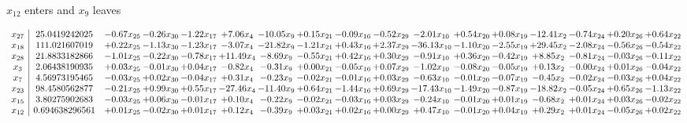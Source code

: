 \documentclass[9pt]{article}
\begin{document}
 $ x_{12} $ enters and $ x_{9} $ leaves 

 \[\begin{array}{c| c c@{\hskip 2pt} c@{\hskip 2pt} c@{\hskip 2pt} c@{\hskip 2pt} c@{\hskip 2pt} c@{\hskip 2pt} c@{\hskip 2pt} c@{\hskip 2pt} c@{\hskip 2pt} c@{\hskip 2pt} c@{\hskip 2pt} c@{\hskip 2pt} c@{\hskip 2pt} c@{\hskip 2pt} c@{\hskip 2pt} }
 x_{27}   &  25.0419242025 & -0.67 x_{25} & -0.26 x_{30} & -1.22 x_{17} & +  7.06 x_{4} & -10.05 x_{9} & +  0.15 x_{21} & -0.09 x_{16} & -0.52 x_{29} & -2.01 x_{10} & +  0.54 x_{20} & +  0.08 x_{19} & -12.41 x_{2} & -0.74 x_{24} & +  0.20 x_{26} & +  0.64 x_{22}\\
 x_{18}   &  111.021607019 & +  0.22 x_{25} & -1.13 x_{30} & -1.23 x_{17} & -3.07 x_{4} & -21.82 x_{9} & -1.21 x_{21} & +  0.43 x_{16} & +  2.37 x_{29} & -36.13 x_{10} & -1.10 x_{20} & -2.55 x_{19} & + 29.45 x_{2} & -2.08 x_{24} & -0.56 x_{26} & -0.54 x_{22}\\
 x_{28}   &  21.8833182866 & -1.01 x_{25} & -0.22 x_{30} & -0.78 x_{17} & + 11.49 x_{4} & -8.69 x_{9} & -0.55 x_{21} & +  0.42 x_{16} & +  0.30 x_{29} & -0.91 x_{10} & +  0.36 x_{20} & -0.42 x_{19} & +  8.85 x_{2} & -0.81 x_{24} & -0.03 x_{26} & -0.11 x_{22}\\
 x_{3}   &  2.06438190935 & +  0.03 x_{25} & -0.01 x_{30} & +  0.04 x_{17} & -0.82 x_{4} & -0.31 x_{9} & +  0.00 x_{21} & -0.05 x_{16} & +  0.07 x_{29} & -1.02 x_{10} & -0.08 x_{20} & -0.05 x_{19} & +  0.13 x_{2} & -0.00 x_{24} & +  0.01 x_{26} & -0.04 x_{22}\\
 x_{7}   &  4.56973195465 & -0.03 x_{25} & +  0.02 x_{30} & -0.04 x_{17} & +  0.31 x_{4} & -0.23 x_{9} & -0.02 x_{21} & -0.01 x_{16} & +  0.03 x_{29} & -0.63 x_{10} & -0.01 x_{20} & -0.07 x_{19} & -0.45 x_{2} & -0.02 x_{24} & -0.03 x_{26} & +  0.04 x_{22}\\
 x_{23}   &  98.4580562877 & -0.21 x_{25} & +  0.99 x_{30} & +  0.55 x_{17} & -27.46 x_{4} & -11.40 x_{9} & +  0.64 x_{21} & -1.44 x_{16} & +  0.69 x_{29} & -17.43 x_{10} & -1.49 x_{20} & -0.87 x_{19} & -18.82 x_{2} & -0.05 x_{24} & +  0.65 x_{26} & -1.13 x_{22}\\
 x_{15}   &  3.80275902683 & -0.03 x_{25} & +  0.06 x_{30} & -0.01 x_{17} & +  0.10 x_{4} & -0.22 x_{9} & -0.02 x_{21} & -0.03 x_{16} & +  0.03 x_{29} & -0.24 x_{10} & -0.01 x_{20} & +  0.01 x_{19} & -0.68 x_{2} & +  0.01 x_{24} & +  0.03 x_{26} & -0.02 x_{22}\\
 x_{12}   &  0.694638296561 & +  0.01 x_{25} & -0.02 x_{30} & +  0.01 x_{17} & +  0.12 x_{4} & -0.39 x_{9} & +  0.03 x_{21} & +  0.02 x_{16} & +  0.00 x_{29} & +  0.47 x_{10} & -0.01 x_{20} & +  0.04 x_{19} & +  0.29 x_{2} & +  0.01 x_{24} & -0.05 x_{26} & +  0.02 x_{22}\\

\end{array}\]
\end{document}
